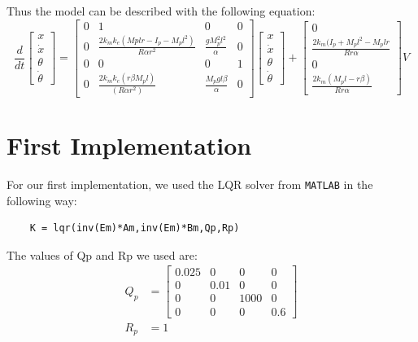 \documentclass{article}
\begin{document}
Thus the model can be described with the following equation:
\[
    \frac{d}{dt}
    \begin{bmatrix}
        x \\
        \dot{x} \\
        \theta \\
        \dot{\theta}
    \end{bmatrix}
    =
    \begin{bmatrix}
        0 & 1 & 0 & 0 \\
        0 & \frac{2k_m k_e (Mp l r - I_p- M_p l^2)}{R \alpha r^2} & \frac{g M_p^2l^2}{\alpha} & 0\\
        0 & 0 & 0 & 1 \\
        0 & \frac{2k_m k_e(r \beta M_pl)}{(R \alpha r^2)} & \frac{M_p g l \beta}{\alpha} & 0 
    \end{bmatrix}
    \begin{bmatrix}
        x \\
        \dot{x} \\
        \theta \\
        \dot{\theta}
    \end{bmatrix}
    +
    \begin{bmatrix}
        0 \\
        \frac{2k_m (I_p+M_p l^2 - M_p l r}{R r \alpha} \\
        0 \\
        \frac{2k_m (M_p l-r \beta )}{R r \alpha} 
    \end{bmatrix}
    V
\]

\vspace{5mm}
\section{First Implementation}

For our first implementation, we used the LQR solver from \texttt{MATLAB} in the following way:
\begin{verbatim}
    K = lqr(inv(Em)*Am,inv(Em)*Bm,Qp,Rp)
\end{verbatim}

The values of Qp and Rp we used are:
\begin{align*}
    Q_p &= \begin{bmatrix}
        0.025&0&0&0\\
        0&0.01&0&0\\
        0&0&1000&0 \\
        0&0&0&0.6
    \end{bmatrix}\\
    R_p &= 1    
\end{align*}
\end{document}
